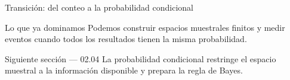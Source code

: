 \documentclass[10pt,aspectratio=169]{beamer}
\begin{document}
\begin{frame}{Transición: del conteo a la probabilidad condicional}
  \small
  \begin{block}{Lo que ya dominamos}
    Podemos construir espacios muestrales finitos y medir eventos cuando todos
    los resultados tienen la misma probabilidad.
  \end{block}
  \begin{alertblock}{Siguiente sección --- 02.04}
    La probabilidad condicional restringe el espacio muestral a la información
    disponible y prepara la regla de Bayes.
  \end{alertblock}
\end{frame}
\end{document}
